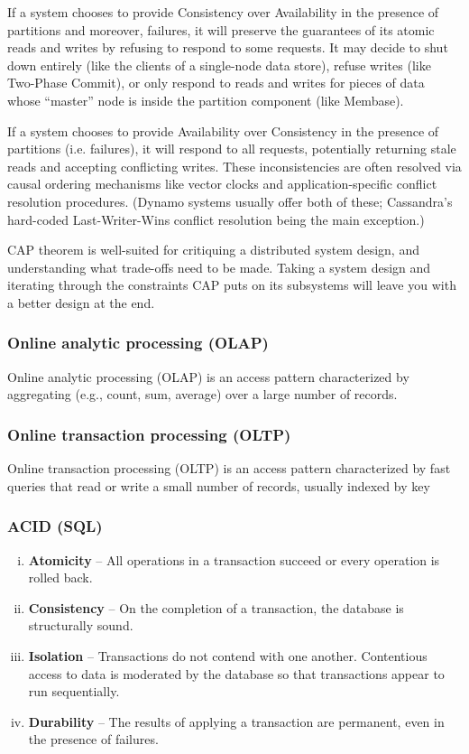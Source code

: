 \documentclass{article}
\begin{document}
    If a system chooses to provide Consistency over Availability in the presence of partitions and moreover, failures, it will preserve the guarantees of its atomic reads and writes by refusing to respond to some requests. It may decide to shut down entirely (like the clients of a single-node data store), refuse writes (like Two-Phase Commit), or only respond to reads and writes for pieces of data whose ``master” node is inside the partition component (like Membase).
    
    If a system chooses to provide Availability over Consistency in the presence of partitions (i.e. failures), it will respond to all requests, potentially returning stale reads and accepting conflicting writes. These inconsistencies are often resolved via causal ordering mechanisms like vector clocks and application-specific conflict resolution procedures. (Dynamo systems usually offer both of these; Cassandra’s hard-coded Last-Writer-Wins conflict resolution being the main exception.)
    
    CAP theorem is well-suited for critiquing a distributed system design, and understanding what trade-offs need to be made. Taking a system design and iterating through the constraints CAP puts on its subsystems will leave you with a better design at the end. 
    
    \subsubsection{Online analytic processing (OLAP)}
    Online analytic processing (OLAP) is an access pattern characterized by aggregating (e.g., count, sum, average) over a large number of records.

    \subsubsection{Online transaction processing (OLTP)}
    Online transaction processing (OLTP) is an access pattern characterized by fast queries that read or write a small number of records, usually indexed by key
    
    \subsubsection{ACID (SQL)}
    \begin{enumerate}[i.]
        \item \textbf{Atomicity} -- All operations in a transaction succeed or every operation is rolled back.
        \item \textbf{Consistency} -- On the completion of a transaction, the database is structurally sound.
        \item \textbf{Isolation} -- Transactions do not contend with one another. Contentious access to data is moderated by the database so that transactions appear to run sequentially.
        \item \textbf{Durability} -- The results of applying a transaction are permanent, even in the presence of failures.
    \end{enumerate}
    
\end{document}
